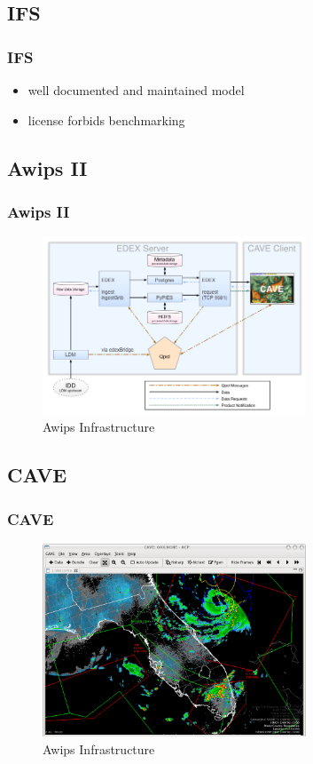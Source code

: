 \documentclass[compress]{beamer}
\begin{document}
\subsection{IFS}
\begin{frame}
	\frametitle{IFS}
	\begin{itemize}
		\item well documented and maintained model
		\item license forbids benchmarking
	\end{itemize}
\end{frame}

\subsection{Awips II}
\begin{frame}
    \frametitle{Awips II}
    \begin{center}
    	\begin{figure}
			\includegraphics[width=0.7\textwidth]{gfx/awipsII.png}
      	  	\caption[]{Awips Infrastructure \cite{Uni01}}
		\end{figure}
	\end{center}
\end{frame}

\subsection{CAVE}
\begin{frame}
    \frametitle{CAVE}
    \begin{center}
    	\begin{figure}
			\includegraphics[width=0.7\textwidth]{gfx/Unidata_AWIPS2_CAVE.png}
      	  	\caption[]{Awips Infrastructure \cite{Uni01}}
		\end{figure}
	\end{center}
\end{frame}
\end{document}

